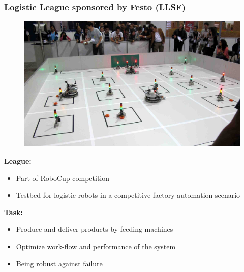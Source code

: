 \documentclass[]{beamer}
\begin{document}
\begin{frame}
  \frametitle{Logistic League sponsored by Festo (LLSF)}
  \fboxsep=0pt
  \noindent
  \begin{minipage}[]{0.48\linewidth}
    \begin{figure}
      \includegraphics[width=\textwidth]{../pics/llsfLeague.png}\\
    \end{figure}
  \end{minipage}
  \hfill
  \begin{minipage}[]{0.48\linewidth}
    \textbf{\large League:}
    \begin{itemize}
    \item Part of RoboCup competition
    \item Testbed for logistic robots in a competitive factory automation scenario
    \end{itemize}
    \pause
    \textbf{\large Task:}
    \begin{itemize}
    \item Produce and deliver products by feeding machines%
    \item Optimize work-flow and performance of the system
    \item Being robust against failure
    \end{itemize}
  \end{minipage}
\end{frame}
\end{document}
